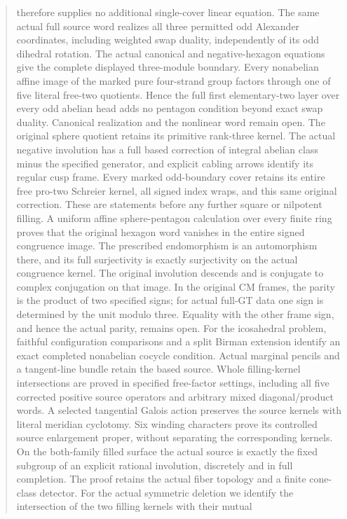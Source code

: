 \documentclass[11pt,a4paper]{article}
\begin{document}
\begin{abstract}
therefore supplies no additional single-cover linear equation. The same actual full
source word realizes all three permitted odd Alexander coordinates,
including weighted swap duality, independently of its odd dihedral
rotation. The actual canonical and negative-hexagon equations give the
complete displayed three-module boundary. Every nonabelian affine
image of the marked pure four-strand group factors through one of five
literal free-two quotients. Hence the full first elementary-two layer
over every odd abelian head adds no pentagon condition beyond exact
swap duality. Canonical realization and the nonlinear word remain open.
The original sphere quotient retains its primitive rank-three kernel.
The actual negative involution has a full based correction of integral
abelian class minus the specified generator, and explicit cabling
arrows identify its regular cusp frame. Every marked odd-boundary
cover retains its entire free pro-two Schreier kernel, all signed
index wraps, and this same original correction. These are statements
before any further square or nilpotent filling.
A uniform affine sphere-pentagon calculation over every finite ring
proves that the original hexagon word vanishes in the entire signed
congruence image. The prescribed endomorphism is an automorphism
there, and its full surjectivity is exactly surjectivity on the actual
congruence kernel. The original involution descends and is conjugate
to complex conjugation on that image. In the original CM frames,
the parity is the product of two specified signs; for actual full-GT
data one sign is determined by the unit modulo three. Equality with
the other frame sign, and hence the actual parity, remains open.
For the icosahedral problem, faithful configuration comparisons and a
split Birman extension identify an exact completed nonabelian cocycle
condition. Actual marginal pencils and a tangent-line bundle retain
the based source. Whole filling-kernel intersections are proved in
specified free-factor settings, including all five corrected positive
source operators and arbitrary mixed diagonal/product words. A selected
tangential Galois action preserves the source kernels with literal
meridian cyclotomy. Six winding characters prove its controlled source
enlargement proper, without separating the corresponding kernels.
On the both-family filled surface the actual source is exactly the
fixed subgroup of an explicit rational involution, discretely and in
full completion. The proof retains the actual fiber topology and a
finite cone-class detector. For the actual symmetric deletion we
identify the intersection of the two filling kernels with their mutual

\end{abstract}
\end{document}
